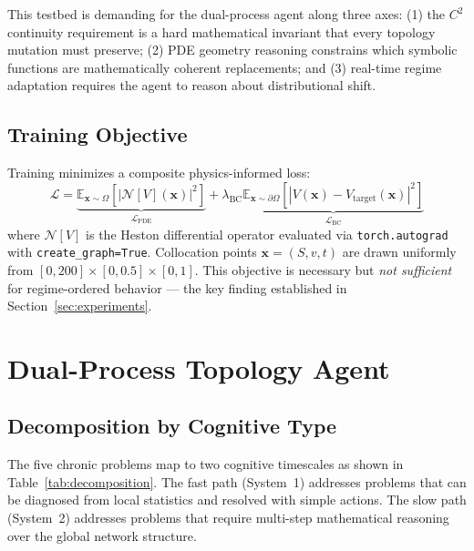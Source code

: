\documentclass[11pt,a4paper]{article}
\begin{document}
This testbed is demanding for the dual-process agent along three axes: (1) the $C^2$
continuity requirement is a hard mathematical invariant that every topology mutation
must preserve; (2) PDE geometry reasoning constrains which symbolic functions are
mathematically coherent replacements; and (3) real-time regime adaptation requires
the agent to reason about distributional shift.

\subsection{Training Objective}
\label{sec:background:loss}

Training minimizes a composite physics-informed loss:
\begin{equation}
\mathcal{L} = \underbrace{\mathbb{E}_{\bm{x} \sim \Omega}\!\left[\left|\mathcal{N}[V](\bm{x})\right|^2\right]}_{\mathcal{L}_\text{PDE}}
+ \lambda_\text{BC}\underbrace{\mathbb{E}_{\bm{x} \sim \partial\Omega}\!\left[\left|V(\bm{x}) - V_\text{target}(\bm{x})\right|^2\right]}_{\mathcal{L}_\text{BC}}
\label{eq:loss}
\end{equation}
where $\mathcal{N}[V]$ is the Heston differential operator evaluated via
\texttt{torch.autograd} with \texttt{create\_graph=True}. Collocation points
$\bm{x}=(S,v,t)$ are drawn uniformly from $[0,200]\times[0,0.5]\times[0,1]$.
This objective is necessary but \emph{not sufficient} for regime-ordered behavior ---
the key finding established in Section~\ref{sec:experiments}.

\section{Dual-Process Topology Agent}
\label{sec:agent}

\subsection{Decomposition by Cognitive Type}
\label{sec:agent:decomposition}

The five chronic problems map to two cognitive timescales as shown in
Table~\ref{tab:decomposition}. The fast path (System~1) addresses problems that can
be diagnosed from local statistics and resolved with simple actions. The slow path
(System~2) addresses problems that require multi-step mathematical reasoning over the
global network structure.
\end{document}
